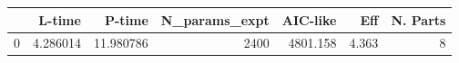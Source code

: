 \begin{tabular}{lrrrrrr}
\toprule
{} &    L-time &     P-time &  N\_params\_expt &  AIC-like &    Eff &  N. Parts \\
\midrule
0 &  4.286014 &  11.980786 &           2400 &  4801.158 &  4.363 &         8 \\
\bottomrule
\end{tabular}
